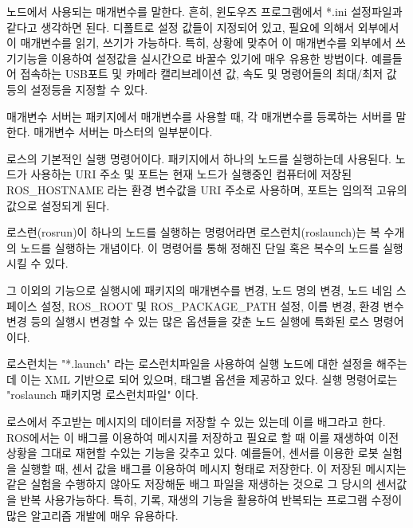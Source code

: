 \begin{definition}
노드에서 사용되는 매개변수를 말한다. 흔히, 윈도우즈 프로그램에서 *.ini 설정파일과 같다고 생각하면 된다. 디폴트로 설정 값들이 지정되어 있고, 필요에 의해서 외부에서 이 매개변수를 읽기, 쓰기가 가능하다. 특히, 상황에 맞추어 이 매개변수를 외부에서 쓰기기능을 이용하여 설정값을 실시간으로 바꿀수 있기에 매우 유용한 방법이다. 예를들어 접속하는 USB포트 및 카메라 캘리브레이션 값, 속도 및 명령어들의 최대/최저 값 등의 설정등을 지정할 수 있다.
\end{definition}

\begin{definition}
매개변수 서버는 패키지에서 매개변수를 사용할 때, 각 매개변수를 등록하는 서버를 말한다. 매개변수 서버는 마스터의 일부분이다. 
\end{definition}

\begin{definition}[rosrun]
로스의 기본적인 실행 명령어이다. 패키지에서 하나의 노드를 실행하는데 사용된다. 노드가 사용하는 URI 주소 및 포트는 현재 노드가 실행중인 컴퓨터에 저장된 ROS\_HOSTNAME 라는 환경 변수값을 URI 주소로 사용하며, 포트는 임의적 고유의 값으로 설정되게 된다.
\end{definition}

\begin{definition}[roslaunch]
로스런(rosrun)이 하나의 노드를 실행하는 명령어라면 로스런치(roslaunch)는 복 수개의 노드를 실행하는 개념이다. 이 명령어를 통해 정해진 단일 혹은 복수의 노드를 실행시킬 수 있다. 

그 이외의 기능으로 실행시에 패키지의 매개변수를 변경, 노드 명의 변경, 노드 네임 스페이스 설정, ROS\_ROOT 및 ROS\_PACKAGE\_PATH 설정, 이름 변경, 환경 변수 변경 등의 실행시 변경할 수 있는 많은 옵션들을 갖춘 노드 실행에 특화된 로스 명령어이다. 

로스런치는 "*.launch" 라는 로스런치파일을 사용하여 실행 노드에 대한 설정을 해주는데 이는 XML 기반으로 되어 있으며, 태그별 옵션을 제공하고 있다. 실행 명령어로는 "roslaunch 패키지명 로스런치파일" 이다.
\end{definition}

\begin{definition}[배그(bag)]
로스에서 주고받는 메시지의 데이터를 저장할 수 있는 있는데 이를 배그라고 한다. ROS에서는 이 배그를 이용하여 메시지를 저장하고 필요로 할 때 이를 재생하여 이전 상황을 그대로 재현할 수있는 기능을 갖추고 있다. 예를들어, 센서를 이용한 로봇 실험을 실행할 때, 센서 값을 배그를 이용하여 메시지 형태로 저장한다. 이 저장된 메시지는 같은 실험을 수행하지 않아도 저장해둔 배그 파일을 재생하는 것으로 그 당시의 센서값을 반복 사용가능하다. 특히, 기록, 재생의 기능을 활용하여 반복되는 프로그램 수정이 많은 알고리즘 개발에 매우 유용하다. 
\end{definition}

